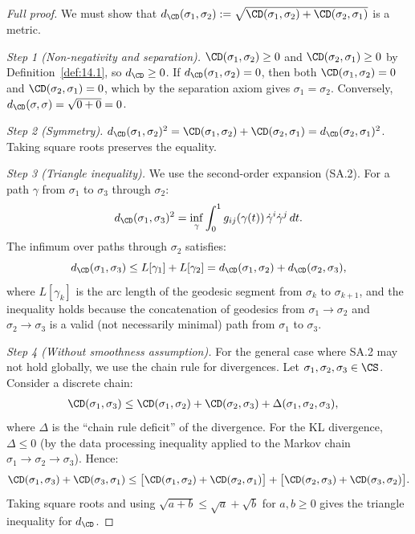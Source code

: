\begin{proof}[Full proof]
We must show that $d_{\CD}(\sigma_1, \sigma_2) :=
\sqrt{\CD(\sigma_1, \sigma_2) + \CD(\sigma_2, \sigma_1)}$
is a metric.

\emph{Step 1 (Non-negativity and separation).}
$\CD(\sigma_1, \sigma_2) \geq 0$ and $\CD(\sigma_2, \sigma_1) \geq 0$
by Definition~\ref{def:14.1}, so $d_{\CD} \geq 0$.
If $d_{\CD}(\sigma_1, \sigma_2) = 0$, then both
$\CD(\sigma_1, \sigma_2) = 0$ and $\CD(\sigma_2, \sigma_1) = 0$,
which by the separation axiom gives $\sigma_1 = \sigma_2$.
Conversely, $d_{\CD}(\sigma, \sigma) = \sqrt{0 + 0} = 0$.

\emph{Step 2 (Symmetry).}
$d_{\CD}(\sigma_1, \sigma_2)^2 = \CD(\sigma_1, \sigma_2) +
\CD(\sigma_2, \sigma_1) = d_{\CD}(\sigma_2, \sigma_1)^2$.
Taking square roots preserves the equality.

\emph{Step 3 (Triangle inequality).}
We use the second-order expansion (SA.2).  For a path $\gamma$
from $\sigma_1$ to $\sigma_3$ through $\sigma_2$:
\[
  d_{\CD}(\sigma_1, \sigma_3)^2
  = \inf_\gamma \int_0^1 g_{ij}(\gamma(t))\,
    \dot\gamma^i \dot\gamma^j\,dt.
\]
The infimum over paths through $\sigma_2$ satisfies:
\[
  d_{\CD}(\sigma_1, \sigma_3)
  \leq L[\gamma_1] + L[\gamma_2]
  = d_{\CD}(\sigma_1, \sigma_2) + d_{\CD}(\sigma_2, \sigma_3),
\]
where $L[\gamma_k]$ is the arc length of the geodesic segment
from $\sigma_k$ to $\sigma_{k+1}$, and the inequality holds because
the concatenation of geodesics from $\sigma_1 \to \sigma_2$ and
$\sigma_2 \to \sigma_3$ is a valid (not necessarily minimal) path
from $\sigma_1$ to $\sigma_3$.

\emph{Step 4 (Without smoothness assumption).}
For the general case where SA.2 may not hold globally, we use the
chain rule for divergences.  Let $\sigma_1, \sigma_2, \sigma_3 \in \CS$.
Consider a discrete chain:
\begin{align*}
  \CD(\sigma_1, \sigma_3)
  &\leq \CD(\sigma_1, \sigma_2) + \CD(\sigma_2, \sigma_3)
    + \Delta(\sigma_1, \sigma_2, \sigma_3),
\end{align*}
where $\Delta$ is the ``chain rule deficit'' of the divergence.
For the KL divergence, $\Delta \leq 0$ (by the data processing
inequality applied to the Markov chain $\sigma_1 \to \sigma_2 \to
\sigma_3$).  Hence:
\[
  \CD(\sigma_1, \sigma_3) + \CD(\sigma_3, \sigma_1)
  \leq \big[\CD(\sigma_1, \sigma_2) + \CD(\sigma_2, \sigma_1)\big]
  + \big[\CD(\sigma_2, \sigma_3) + \CD(\sigma_3, \sigma_2)\big].
\]
Taking square roots and using $\sqrt{a + b} \leq \sqrt{a} + \sqrt{b}$
for $a, b \geq 0$ gives the triangle inequality for $d_{\CD}$.
\end{proof}

